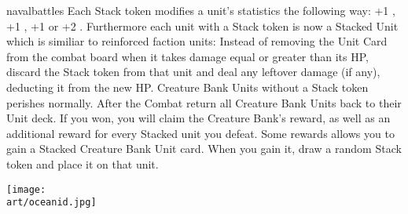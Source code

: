 \begin{multicols*}{2}
\begin{expansion}[before=\vspace*{-11mm}]{navalbattles}
  Each Stack token modifies a unit's statistics the following way: +1 , +1 , +1  or +2 .
  Furthermore each unit with a Stack token is now a Stacked Unit which is similiar to reinforced faction units: Instead of removing the Unit Card from the combat board when it takes damage equal or greater than its HP, discard the Stack token from that unit and deal any leftover damage (if any), deducting it from the new HP.
  Creature Bank Units without a Stack token perishes normally.
  After the Combat return all Creature Bank Units back to their Unit deck.
  If you won, you will claim the Creature Bank's reward, as well as an additional reward for every Stacked unit you defeat.
  Some rewards allows you to gain a Stacked Creature Bank Unit card.
  When you gain it, draw a random Stack token and place it on that unit.
\end{expansion}
\columnbreak

\texttt{[image: \\art/oceanid.jpg]}

\end{multicols*}
